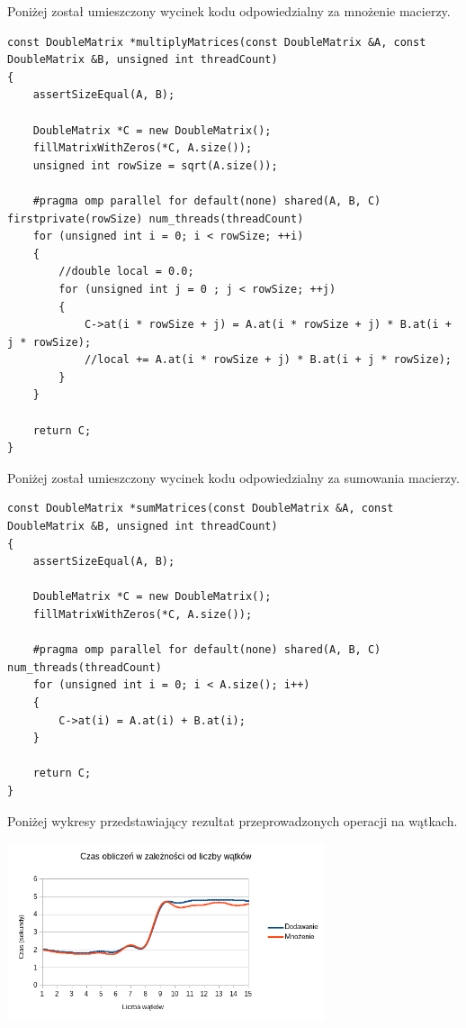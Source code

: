 \documentclass[a4paper,12pt]{article}
\begin{document}
Poniżej został umieszczony wycinek kodu odpowiedzialny za mnożenie macierzy.

\begin{lstlisting}
const DoubleMatrix *multiplyMatrices(const DoubleMatrix &A, const DoubleMatrix &B, unsigned int threadCount)
{
    assertSizeEqual(A, B);

    DoubleMatrix *C = new DoubleMatrix();
    fillMatrixWithZeros(*C, A.size());
    unsigned int rowSize = sqrt(A.size());

    #pragma omp parallel for default(none) shared(A, B, C) firstprivate(rowSize) num_threads(threadCount)
    for (unsigned int i = 0; i < rowSize; ++i)
    {
        //double local = 0.0;
        for (unsigned int j = 0 ; j < rowSize; ++j)
        {
            C->at(i * rowSize + j) = A.at(i * rowSize + j) * B.at(i + j * rowSize);
            //local += A.at(i * rowSize + j) * B.at(i + j * rowSize);
        }
    }

    return C;
}
\end{lstlisting}

Poniżej został umieszczony wycinek kodu odpowiedzialny za sumowania macierzy.
\begin{lstlisting}
const DoubleMatrix *sumMatrices(const DoubleMatrix &A, const DoubleMatrix &B, unsigned int threadCount)
{
    assertSizeEqual(A, B);

    DoubleMatrix *C = new DoubleMatrix();
    fillMatrixWithZeros(*C, A.size());

    #pragma omp parallel for default(none) shared(A, B, C) num_threads(threadCount)
    for (unsigned int i = 0; i < A.size(); i++)
    {
        C->at(i) = A.at(i) + B.at(i);
    }

    return C;
}
\end{lstlisting}

Poniżej wykresy przedstawiający rezultat przeprowadzonych operacji na wątkach.
\\
\begin{center}
\includegraphics[width=0.7\textwidth]{data/czas.png}
\end{center}
\end{document}
